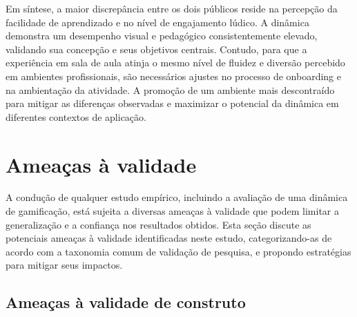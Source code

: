 \documentclass[
	12pt,
	openright,
	twoside,
	a4paper,
	english,
	brazil
	]{abntex2}
\begin{document}
Em síntese, a maior discrepância entre os dois públicos reside na percepção da facilidade de aprendizado e no nível de engajamento lúdico. A dinâmica demonstra um desempenho visual e pedagógico consistentemente elevado, validando sua concepção e seus objetivos centrais. Contudo, para que a experiência em sala de aula atinja o mesmo nível de fluidez e diversão percebido em ambientes profissionais, são necessários ajustes no processo de onboarding e na ambientação da atividade. A promoção de um ambiente mais descontraído para mitigar as diferenças observadas e maximizar o potencial da dinâmica em diferentes contextos de aplicação.


\section{Ameaças à validade}

A condução de qualquer estudo empírico, incluindo a avaliação de uma dinâmica de gamificação, está sujeita a diversas ameaças à validade que podem limitar a generalização e a confiança nos resultados obtidos. Esta seção discute as potenciais ameaças à validade identificadas neste estudo, categorizando-as de acordo com a taxonomia comum de validação de pesquisa, e propondo estratégias para mitigar seus impactos.

\subsection{Ameaças à validade de construto}
\label{sec:ameacas-construto}
\end{document}

